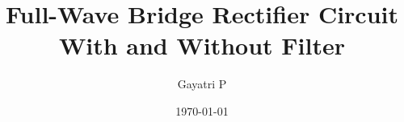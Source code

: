 \documentclass[reprint,amsmath,amssymb,aps]{revtex4-2}
\begin{document}
    \title{Full-Wave Bridge Rectifier Circuit With and Without Filter}

    \author{Gayatri P}
    \date{\today}

    
    \maketitle

    
    
    

    
    
    \nocite{*}
\end{document}
